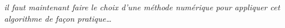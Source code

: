 %


\bigskip
\textit{il faut maintenant faire le choix d'une méthode numérique pour appliquer cet algorithme de façon pratique\ldots}